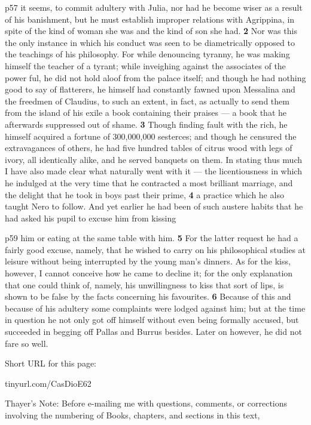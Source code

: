 p57 it seems, to commit adultery with Julia, nor had he become wiser as a result of his banishment, but he must establish improper relations with Agrippina, in spite of the kind of woman she was and the kind of son she had. \textbf{2} Nor was this the only instance in which his conduct was seen to be diametrically opposed to the teachings of his philosophy. For while denouncing tyranny, he was making himself the teacher of a tyrant; while inveighing against the associates of the power ­ful, he did not hold aloof from the palace itself; and though he had nothing good to say of flatterers, he himself had constantly fawned upon Messalina and the freedmen of Claudius, to such an extent, in fact, as actually to send them from the island of his exile a book containing their praises \texthebrew{—} a book that he afterwards suppressed out of shame. \textbf{3} Though finding fault with the rich, he himself acquired a fortune of 300,000,000 sesterces; and though he censured the extravagances of others, he had five hundred tables of citrus wood with legs of ivory, all identically alike, and he served banquets on them. In stating thus much I have also made clear what naturally went with it \texthebrew{—} the licentiousness in which he indulged at the very time that he contracted a most brilliant marriage, and the delight that he took in boys past their prime, \textbf{4} a practice which he also taught Nero to follow. And yet earlier he had been of such austere habits that he had asked his pupil to excuse him from kissing

p59 him or eating at the same table with him. \textbf{5} For the latter request he had a fairly good excuse, namely, that he wished to carry on his philosophical studies at leisure without being interrupted by the young man's dinners. As for the kiss, however, I cannot conceive how he came to decline it; for the only explanation that one could think of, namely, his unwillingness to kiss that sort of lips, is shown to be false by the facts concerning his favourites. \textbf{6} Because of this and because of his adultery some complaints were lodged against him; but at the time in question he not only got off himself without even being formally accused, but succeeded in begging off Pallas and Burrus besides. Later on however, he did not fare so well.


Short URL for this page:

tinyurl.com/CasDioE62

Thayer's Note: Before e-mailing me with questions, comments, or corrections involving the numbering of Books, chapters, and sections in this text,

